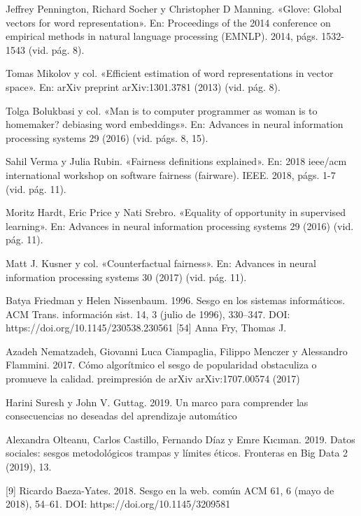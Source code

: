\documentclass[runningheads,a4paper]{llncs}
\begin{document}
\begin{thebibliography}{99}
Jeffrey Pennington, Richard Socher y Christopher D Manning. «Glove: Global
vectors for word representation». En: Proceedings of the 2014 conference on empirical methods in natural language processing (EMNLP). 2014, p\'ags. 1532-1543
(vid. p\'ag. 8).

Tomas Mikolov y col. «Efficient estimation of word representations in vector
space». En: arXiv preprint arXiv:1301.3781 (2013) (vid. p\'ag. 8).

Tolga Bolukbasi y col. «Man is to computer programmer as woman is to homemaker? debiasing word embeddings». En: Advances in neural information
processing systems 29 (2016) (vid. p\'ags. 8, 15).

Sahil Verma y Julia Rubin. «Fairness definitions explained». En: 2018 ieee/acm
international workshop on software fairness (fairware). IEEE. 2018, p\'ags. 1-7
(vid. p\'ag. 11).

Moritz Hardt, Eric Price y Nati Srebro. «Equality of opportunity in supervised
learning». En: Advances in neural information processing systems 29 (2016)
(vid. p\'ag. 11).

Matt J. Kusner y col. «Counterfactual fairness». En: Advances in neural information processing systems 30 (2017) (vid. p\'ag. 11).

 Batya Friedman y Helen Nissenbaum. 1996. Sesgo en los sistemas inform\'aticos. ACM Trans. informaci\'on sist. 14, 3 (julio de 1996), 330–347. DOI: https://doi.org/10.1145/230538.230561 [54] Anna Fry, Thomas J. 

 Azadeh Nematzadeh, Giovanni Luca Ciampaglia, Filippo Menczer y Alessandro Flammini. 2017. C\'omo algor\'itmico el sesgo de popularidad obstaculiza o promueve la calidad. preimpresi\'on de arXiv arXiv:1707.00574 (2017)

Harini Suresh y John V. Guttag. 2019. Un marco para comprender las consecuencias no deseadas del aprendizaje automático

Alexandra Olteanu, Carlos Castillo, Fernando D\'iaz y Emre Kıcıman. 2019. Datos sociales: sesgos metodol\'ogicos trampas y l\'imites \'eticos. Fronteras en Big Data 2 (2019), 13.

 [9] Ricardo Baeza-Yates. 2018. Sesgo en la web. común ACM 61, 6 (mayo de 2018), 54–61. DOI: https://doi.org/10.1145/3209581


\end{thebibliography}
\end{document}
